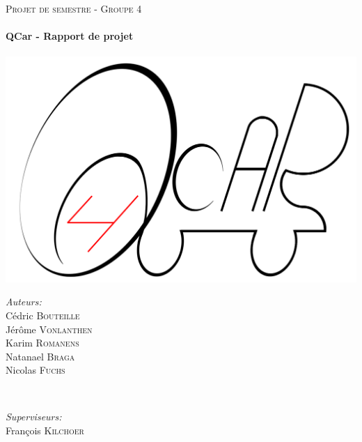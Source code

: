 \documentclass[a4paper, 12pt]{article}
\begin{document}
\begin{titlepage}
\textsc{\large Projet de semestre - Groupe 4}\\[0.5cm] %
\HRule \\[0.4cm]
{ \huge \bfseries QCar - Rapport de projet}\\[0.4cm] %
\HRule \\[1.5cm]
\includegraphics[width=0.65\linewidth]{includes/images/logo}\\[1cm] %
\begin{minipage}{0.4\textwidth}
\begin{flushleft} \large
\emph{Auteurs:}\\
Cédric \textsc{Bouteille}\\ %
Jérôme \textsc{Vonlanthen}\\
Karim \textsc{Romanens}\\
Natanael \textsc{Braga}\\
Nicolas \textsc{Fuchs}\\
\end{flushleft}
\end{minipage}
~
\begin{minipage}{0.4\textwidth}
\begin{flushright} \large
\emph{Superviseurs:} \\
François \textsc{Kilchoer}\\ %

\end{flushright}
\end{minipage}
\end{titlepage}
\end{document}
